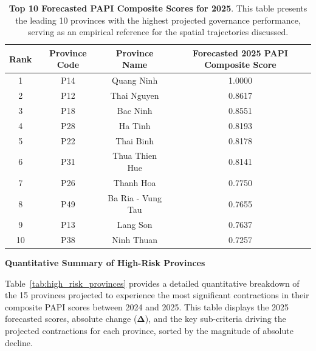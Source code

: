 \documentclass[12pt,a4paper]{article}
\begin{document}
\begin{table}[H]
\centering
\caption{\textbf{Top 10 Forecasted PAPI Composite Scores for 2025}. This table presents the leading 10 provinces with the highest projected governance performance, serving as an empirical reference for the spatial trajectories discussed.}
\label{tab:app_top10_papi_2025}
\small
\begin{tabular}{cccc}
\toprule
\textbf{Rank} & \textbf{Province Code} & \textbf{Province Name} & \textbf{Forecasted 2025 PAPI Composite Score} \\
\midrule
1 & P14 & Quang Ninh & 1.0000 \\
2 & P12 & Thai Nguyen & 0.8617 \\
3 & P18 & Bac Ninh & 0.8551 \\
4 & P28 & Ha Tinh & 0.8193 \\
5 & P22 & Thai Binh & 0.8178 \\
6 & P31 & Thua Thien Hue & 0.8141 \\
7 & P26 & Thanh Hoa & 0.7750 \\
8 & P49 & Ba Ria - Vung Tau & 0.7655 \\
9 & P13 & Lang Son & 0.7637 \\
10 & P38 & Ninh Thuan & 0.7257 \\
\bottomrule
\end{tabular}
\end{table}

\vspace{1.5em}
\textbf{Quantitative Summary of High-Risk Provinces}

Table~\ref{tab:high_risk_provinces} provides a detailed quantitative breakdown of the 15 provinces projected to experience the most significant contractions in their composite PAPI scores between 2024 and 2025. This table displays the 2025 forecasted scores, absolute change ($\bm{\Delta}$), and the key sub-criteria driving the projected contractions for each province, sorted by the magnitude of absolute decline.
\end{document}
